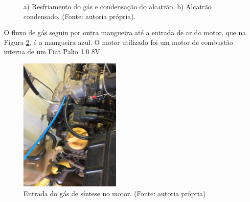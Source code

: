 \begin{figure}[!htb]
	\centering
	\quad %
	\caption{a) Resfriamento do gás e condensação do alcatrão. b) Alcatrão condensado. (Fonte: autoria própria).}
	\label{sistema_limpeza}
\end{figure}

O fluxo de gás seguiu por outra mangueira até a entrada de ar do motor, que na Figura \ref{entrada_gas}, é a mangueira azul. O motor utilizado foi um motor de combustão interna de um Fiat Palio 1.0 8V.

\begin{figure}[!htb]
	\centering
	\includegraphics[width = 5cm]{entrada_gas}
	\caption{Entrada do gás de síntese no motor. (Fonte: autoria própria)}
	\label{entrada_gas}
\end{figure}

